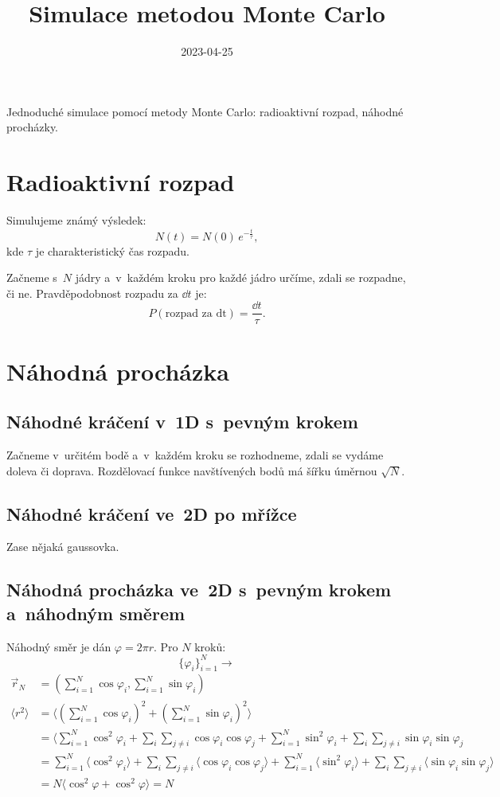 \documentclass[a4paper]{article}
\title{Simulace metodou Monte Carlo}
\date{2023-04-25}
\begin{document}
Jednoduché simulace pomocí metody Monte Carlo:
radioaktivní rozpad, náhodné procházky.

\section{Radioaktivní rozpad}
Simulujeme známý výsledek:
\begin{equation}
    N(t) = N(0) \, e^{-\frac{t}{\tau}},
\end{equation}
kde $\tau$ je charakteristický čas rozpadu.

Začneme s~$N$ jádry a~v~každém kroku pro každé jádro určíme,
zdali se rozpadne, či ne.
Pravděpodobnost rozpadu za $\dd{t}$ je:
\begin{equation}
    P(\text{rozpad za dt}) = \frac{\dd{t}}{\tau}.
\end{equation}

\section{Náhodná procházka}
\subsection{Náhodné kráčení v~1D s~pevným krokem}
Začneme v~určitém bodě a~v~každém kroku se rozhodneme,
zdali se vydáme doleva či doprava.
Rozdělovací funkce navštívených bodů má šířku úměrnou $\sqrt{N}$.

\subsection{Náhodné kráčení ve~2D po mřížce}
Zase nějaká gaussovka.

\subsection{Náhodná procházka ve~2D s~pevným krokem a~náhod\-ným směrem}
\newcommand\sumN{\sum_{i=1}^N}
\newcommand\mean[1]{\langle #1 \rangle}
Náhodný směr je dán $\varphi = 2 \pi r$.
Pro $N$ kroků:
\begin{equation}
    \{\varphi_i\}_{i=1}^N \rightarrow
\end{equation}
\begin{align}
    \vec{r}_N &= \left(
        \sum_{i=1}^N \cos\varphi_i, \sum_{i=1}^N \sin\varphi_i
    \right)
    \\
    \langle r^2 \rangle &= \langle
        \left(\sum_{i=1}^N \cos\varphi_i\right)^2
        + \left(\sum_{i=1}^N \sin\varphi_i\right)^2
    \rangle
    \\
    &= \langle \sumN \cos^2 \varphi_i
        + \sum_i\sum_{j \ne i} \cos\varphi_i\cos\varphi_j
        + \sumN \sin^2 \varphi_i
        + \sum_i\sum_{j \ne i} \sin\varphi_i\sin\varphi_j
    \\
    &= \sumN \mean{\cos^2 \varphi_i}
        + \sum_i\sum_{j \ne i} \mean{\cos\varphi_i\cos\varphi_j}
        + \sumN \mean{\sin^2 \varphi_i}
        + \sum_i\sum_{j \ne i} \mean{\sin\varphi_i\sin\varphi_j}
    \\
    &= N \mean{\cos^2\varphi + \cos^2\varphi} = N
\end{align}
\end{document}
